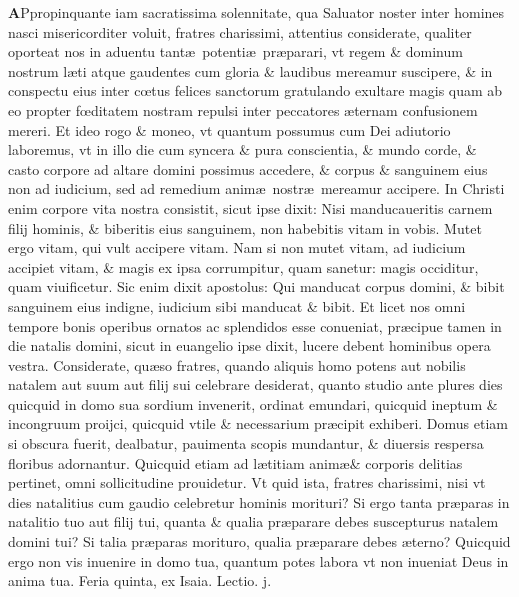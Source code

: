 \documentclass[a5paper,10pt]{book}
\def\ae{æ}
\def\oe{œ}
\begin{document}
\begin{multicols*}{2}
\vspace{-1.5em}
\lettrine[lines=2]{\bfseries \color{red} A}{}Ppropinquante iam sacratissima solennitate, qua Saluator noster inter homines nasci misericorditer voluit, fratres charissimi, attentius considerate, qualiter oporteat nos in aduentu tant\ae \ potenti\ae \ pr\ae parari, vt regem \& dominum nostrum l\ae ti atque gaudentes cum gloria \& laudibus mereamur suscipere, \& in conspectu eius inter c\oe tus felices sanctorum gratulando exultare magis quam ab eo propter f\oe ditatem nostram repulsi inter peccatores \ae ternam confusionem mereri.
Et ideo rogo \& moneo, vt quantum possumus cum Dei adiutorio laboremus, vt in illo die cum syncera \& pura conscientia, \& mundo corde, \& casto corpore ad altare domini possimus accedere, \& corpus \& sanguinem eius non ad iudicium, sed ad remedium anim\ae \ nostr\ae \ mereamur accipere.
In Christi enim corpore vita nostra consistit, sicut ipse dixit: Nisi manducaueritis carnem filij hominis, \& biberitis eius sanguinem, non habebitis vitam in vobis.
Mutet ergo vitam, qui vult accipere vitam.
Nam si non mutet vitam, ad iudicium accipiet vitam, \& magis ex ipsa corrumpitur, quam sanetur: magis occiditur, quam viuificetur.
Sic enim dixit apostolus: Qui manducat corpus domini, \& bibit sanguinem eius indigne, iudicium sibi manducat \& bibit.
Et licet nos omni tempore bonis operibus ornatos ac splendidos esse conueniat, pr\ae cipue tamen in die natalis domini, sicut in euangelio ipse dixit, lucere debent hominibus opera vestra.
Considerate, qu\ae so fratres, quando aliquis homo potens aut nobilis natalem aut suum aut filij sui celebrare desiderat, quanto studio ante plures dies quicquid in domo sua sordium invenerit, ordinat emundari, quicquid ineptum \& incongruum proijci, quicquid vtile \& necessarium pr\ae cipit exhiberi.
Domus etiam si obscura fuerit, dealbatur, pauimenta scopis mundantur, \& diuersis respersa floribus adornantur.
Quicquid etiam ad l\ae titiam anim\ae \& corporis delitias pertinet, omni sollicitudine prouidetur.
Vt quid ista, fratres charissimi, nisi vt dies natalitius cum gaudio celebretur hominis morituri?
Si ergo tanta pr\ae paras in natalitio tuo aut filij tui, quanta \& qualia pr\ae parare debes suscepturus natalem domini tui?
Si talia pr\ae paras morituro, qualia pr\ae parare debes \ae terno?
Quicquid ergo non vis inuenire in domo tua, quantum potes labora vt non inueniat Deus in anima tua.
\newline {} \color{red} \hypertarget{THU-PRIMA-ADV}{Feria quinta,} ex Isaia. \hfill Lectio. j. \color{black}

\end{multicols*}
\end{document}
